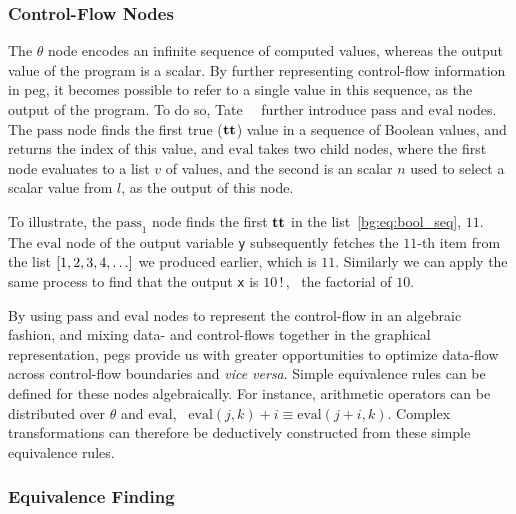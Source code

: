\subsubsection{Control-Flow Nodes}

The $\theta$ node encodes an infinite sequence of computed values, whereas
the output value of the program is a scalar.  By further representing
control-flow information in \gls{peg}, it becomes possible to refer to a
single value in this sequence, as the output of the program.  To do so,
Tate~\etal~\cite{tate09} further introduce $\mathrm{pass}$ and $\mathrm{eval}$
nodes.  The $\mathrm{pass}$ node finds the first true ($\mathbf{tt}$) value
in a sequence of Boolean values, and returns the index of this value, and
$\mathrm{eval}$ takes two child nodes, where the first node evaluates to a list
$v$ of values, and the second is an scalar $n$ used to select a scalar value
from $l$, as the output of this node.

To illustrate, the $\mathrm{pass}_1$ node finds the first $\mathbf{tt}$ in the
list~\eqref{bg:eq:bool_seq}, $11$.  The $\mathrm{eval}$ node of the output
variable \verb|y| subsequently fetches the $11$-th item from the list $[1, 2,
3, 4, \mathellipsis]$ we produced earlier, which is $11$.  Similarly we can
apply the same process to find that the output \verb|x| is \mbox{$10\,!\,$},
\ie~the factorial of $10$.

By using $\mathrm{pass}$ and $\mathrm{eval}$ nodes to represent the
control-flow in an algebraic fashion, and mixing data- and control-flows
together in the graphical representation, \glspl{peg} provide us with
greater opportunities to optimize data-flow across control-flow boundaries
and \emph{vice versa}.  Simple equivalence rules can be defined for these
nodes algebraically.  For instance, arithmetic operators can be distributed
over $\theta$ and $\mathrm{eval}$, \eg~$\mathrm{eval}(j, k) + i \equiv
\mathrm{eval}(j + i, k)$.  Complex transformations can therefore be deductively
constructed from these simple equivalence rules.

\subsubsection{Equivalence Finding}

